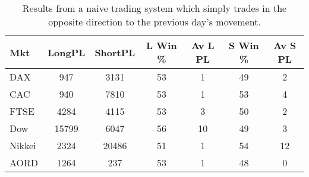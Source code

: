 \begin{table}[ht]
\centering
\caption[Results from the Naive Reversing System.]{Results from a naive trading system which simply trades in the opposite direction to the previous day's movement.} 
\label{tab:n_rev_results}
\begin{tabular}{lcccccc}
  \toprule Mkt & LongPL & ShortPL & L Win \% & Av L PL & S Win \% & Av S PL \\ 
  \midrule DAX & 947 & 3131 & 53 & 1 & 49 & 2 \\ 
  CAC & 940 & 7810 & 53 & 1 & 53 & 4 \\ 
  FTSE & 4284 & 4115 & 53 & 3 & 50 & 2 \\ 
  Dow & 15799 & 6047 & 56 & 10 & 49 & 3 \\ 
  Nikkei & 2324 & 20486 & 51 & 1 & 54 & 12 \\ 
  AORD & 1264 & 237 & 53 & 1 & 48 & 0 \\ 
   \bottomrule \end{tabular}
\end{table}
